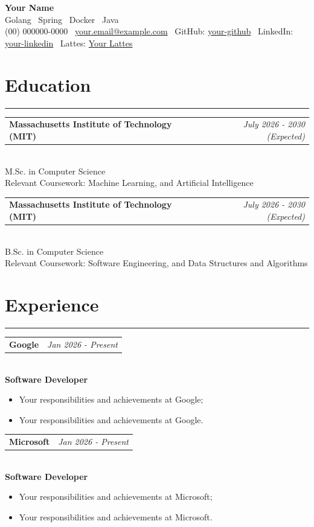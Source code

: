 \documentclass[10pt]{article}
\makeatletter
\newcommand{\sectionline}{\vspace{-2pt}\noindent\rule{\linewidth}{0.6pt}\vspace{1pt}}
\newcommand{\itemheader}[2]{%
  \noindent
  \begin{tabular*}{\linewidth}{@{\extracolsep{\fill}} l r}
    \textbf{#1} & \textit{#2}
  \end{tabular*}\\[2pt]
}
\makeatother
\begin{document}
\begin{center}
    {\LARGE \textbf{Your Name}}\\[4pt]
    Golang \textbar\ Spring \textbar\ Docker \textbar\ Java \\[6pt]
    (00) 000000-0000 \textbar\
    \href{mailto:your.email@example.com}{your.email@example.com} \textbar\
    GitHub: \href{https://github.com/your-github}{your-github} \textbar\
    LinkedIn: \href{https://linkedin.com/in/your-linkedin}{your-linkedin} \textbar\
    Lattes: \href{http://lattes.cnpq.br/}{Your Lattes}
\end{center}

\vspace{1pt}

\section*{Education}
\sectionline

\itemheader{Massachusetts Institute of Technology (MIT)}{July 2026 - 2030 (Expected)}
M.Sc. in Computer Science\\
Relevant Coursework: Machine Learning, and Artificial Intelligence

\vspace{1pt}

\itemheader{Massachusetts Institute of Technology (MIT)}{July 2026 - 2030 (Expected)}
B.Sc. in Computer Science\\
Relevant Coursework: Software Engineering, and Data Structures and Algorithms

\vspace{1pt}


\section*{Experience}
\sectionline

\itemheader{Google}{Jan 2026 - Present}
\textbf{Software Developer}
\begin{itemize}
    \item Your responsibilities and achievements at Google;
    \item Your responsibilities and achievements at Google.
\end{itemize}

\vspace{1pt}

\itemheader{Microsoft}{Jan 2026 - Present}
\textbf{Software Developer}
\begin{itemize}
    \item Your responsibilities and achievements at Microsoft;
    \item Your responsibilities and achievements at Microsoft.
\end{itemize}
\end{document}
